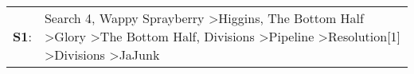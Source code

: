 \begin{supertabular}{p{0.03\textwidth}p{0.92\textwidth}}
 \textbf{S1}:  &  Search 4\textsuperscript{}, \enspace Wappy Sprayberry\textsuperscript{} \textgreater \enspace Higgins\textsuperscript{}, \enspace The Bottom Half\textsuperscript{} \textgreater \enspace Glory\textsuperscript{} \textgreater \enspace The Bottom Half\textsuperscript{}, \enspace Divisions\textsuperscript{} \textgreater \enspace Pipeline\textsuperscript{} \textgreater \enspace Resolution[1]\textsuperscript{} \textgreater \enspace Divisions\textsuperscript{} \textgreater \enspace JaJunk\textsuperscript{}  \enspace  \\
\end{supertabular}
